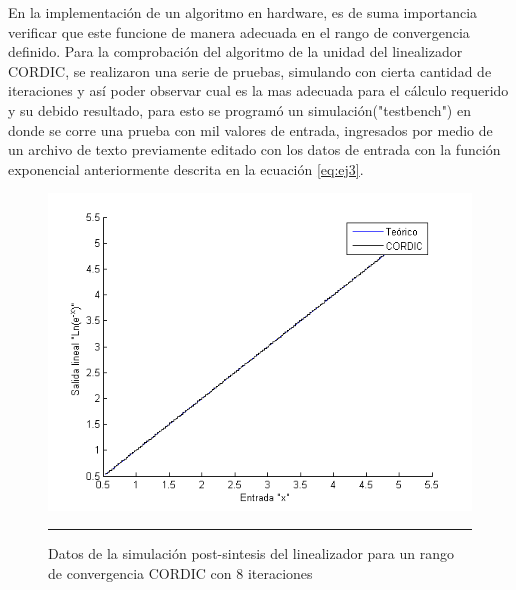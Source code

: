 En la implementación de un algoritmo en hardware, es de suma importancia verificar que este funcione de manera adecuada en el rango de convergencia definido. Para la comprobación del algoritmo de la unidad del linealizador CORDIC, se realizaron una serie de pruebas, simulando con cierta cantidad de iteraciones y así poder observar cual es la mas adecuada para el cálculo requerido y su debido resultado, para esto se programó un simulación("testbench") en donde se corre una prueba con mil valores de entrada, ingresados por medio de un archivo de texto previamente editado con los datos de entrada con la función exponencial anteriormente descrita en la ecuación \ref{eq:ej3}. 


\begin{figure}[H]
  \centering
    \includegraphics[scale=0.7]{./RANGO_8iter.png}
    \rule{35em}{0.5pt}
  \caption[Datos de la simulación post-sintesis del linealizador para un rango de convergencia CORDIC con 8 iteraciones]{Datos de la simulación post-sintesis del linealizador para un rango de convergencia CORDIC con 8 iteraciones  }
  \label{fig:RG8}
\end{figure}

